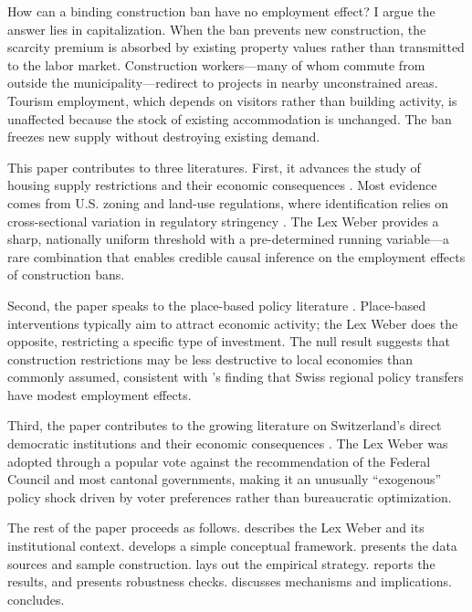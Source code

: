 \documentclass[12pt]{article}
\begin{document}
How can a binding construction ban have no employment effect? I argue the answer lies in capitalization. When the ban prevents new construction, the scarcity premium is absorbed by existing property values rather than transmitted to the labor market. Construction workers---many of whom commute from outside the municipality---redirect to projects in nearby unconstrained areas. Tourism employment, which depends on visitors rather than building activity, is unaffected because the stock of existing accommodation is unchanged. The ban freezes new supply without destroying existing demand.

This paper contributes to three literatures. First, it advances the study of housing supply restrictions and their economic consequences \citep{saiz2010, glaeser2005, hsieh2019}. Most evidence comes from U.S. zoning and land-use regulations, where identification relies on cross-sectional variation in regulatory stringency \citep{gyourko2008}. The Lex Weber provides a sharp, nationally uniform threshold with a pre-determined running variable---a rare combination that enables credible causal inference on the employment effects of construction bans.

Second, the paper speaks to the place-based policy literature \citep{kline2014, busso2013, vonehrlich2018}. Place-based interventions typically aim to attract economic activity; the Lex Weber does the opposite, restricting a specific type of investment. The null result suggests that construction restrictions may be less destructive to local economies than commonly assumed, consistent with \citet{vonehrlich2018}'s finding that Swiss regional policy transfers have modest employment effects.

Third, the paper contributes to the growing literature on Switzerland's direct democratic institutions and their economic consequences \citep{basten2017}. The Lex Weber was adopted through a popular vote against the recommendation of the Federal Council and most cantonal governments, making it an unusually ``exogenous'' policy shock driven by voter preferences rather than bureaucratic optimization.

The rest of the paper proceeds as follows.  describes the Lex Weber and its institutional context.  develops a simple conceptual framework.  presents the data sources and sample construction.  lays out the empirical strategy.  reports the results, and  presents robustness checks.  discusses mechanisms and implications.  concludes.
\end{document}
